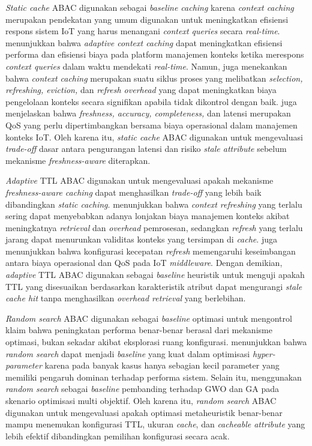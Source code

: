 \textit{Static cache} ABAC digunakan sebagai \textit{baseline caching} karena \textit{context caching} merupakan pendekatan yang umum digunakan untuk meningkatkan efisiensi respons sistem IoT yang harus menangani \textit{context queries} secara \textit{real-time}. \textcite{weerasinghe_adaptive_2023} menunjukkan bahwa \textit{adaptive context caching} dapat meningkatkan efisiensi performa dan efisiensi biaya pada platform manajemen konteks ketika merespons \textit{context queries} dalam waktu mendekati \textit{real-time}. Namun, \textcite{weerasinghe_adaptive_2023} juga menekankan bahwa \textit{context caching} merupakan suatu siklus proses yang melibatkan \textit{selection, refreshing, eviction,} dan \textit{refresh overhead} yang dapat meningkatkan biaya pengelolaan konteks secara signifikan apabila tidak dikontrol dengan baik. \textcite{medvedev_refresh_2023} juga menjelaskan bahwa \textit{freshness, accuracy, completeness,} dan latensi merupakan QoS yang perlu dipertimbangkan bersama biaya operasional dalam manajemen konteks IoT. Oleh karena itu, \textit{static cache} ABAC digunakan untuk mengevaluasi \textit{trade-off} dasar antara pengurangan latensi dan risiko \textit{stale attribute} sebelum mekanisme \textit{freshness-aware} diterapkan.

\textit{Adaptive} TTL ABAC digunakan untuk mengevaluasi apakah mekanisme \textit{freshness-aware caching} dapat menghasilkan \textit{trade-off} yang lebih baik dibandingkan \textit{static caching}. \textcite{weerasinghe_adaptive_2023} menunjukkan bahwa \textit{context refreshing} yang terlalu sering dapat menyebabkan adanya lonjakan biaya manajemen konteks akibat meningkatnya \textit{retrieval} dan \textit{overhead} pemrosesan, sedangkan \textit{refresh} yang terlalu jarang dapat menurunkan validitas konteks yang tersimpan di \textit{cache}. \textcite{medvedev_refresh_2023} juga menunjukkan bahwa konfigurasi kecepatan \textit{refresh} memengaruhi keseimbangan antara biaya operasional dan QoS pada IoT \textit{middleware}. Dengan demikian, \textit{adaptive} TTL ABAC digunakan sebagai \textit{baseline} heuristik untuk menguji apakah TTL yang disesuaikan berdasarkan karakteristik atribut dapat mengurangi \textit{stale cache hit} tanpa menghasilkan \textit{overhead retrieval} yang berlebihan.

\textit{Random search} ABAC digunakan sebagai \textit{baseline} optimasi untuk mengontrol klaim bahwa peningkatan performa benar-benar berasal dari mekanisme optimasi, bukan sekadar akibat eksplorasi ruang konfigurasi. \textcite{bergstra_random_2012} menunjukkan bahwa \textit{random search} dapat menjadi \textit{baseline} yang kuat dalam optimisasi \textit{hyper-parameter} karena pada banyak kasus hanya sebagian kecil parameter yang memiliki pengaruh dominan terhadap performa sistem. Selain itu, \textcite{feng_dynamic_2025} menggunakan \textit{random search} sebagai \textit{baseline} pembanding terhadap GWO dan GA pada skenario optimisasi multi objektif. Oleh karena itu, \textit{random search} ABAC digunakan untuk mengevaluasi apakah optimasi metaheuristik benar-benar mampu menemukan konfigurasi TTL, ukuran \textit{cache}, dan \textit{cacheable attribute} yang lebih efektif dibandingkan pemilihan konfigurasi secara acak.

